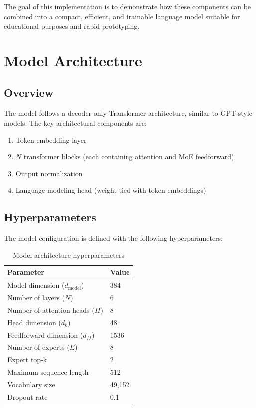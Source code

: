 \documentclass[11pt,a4paper]{article}
\begin{document}
The goal of this implementation is to demonstrate how these components can be combined into a compact, efficient, and trainable language model suitable for educational purposes and rapid prototyping.

\section{Model Architecture}

\subsection{Overview}

The model follows a decoder-only Transformer architecture, similar to GPT-style models. The key architectural components are:

\begin{enumerate}
    \item Token embedding layer
    \item $N$ transformer blocks (each containing attention and MoE feedforward)
    \item Output normalization
    \item Language modeling head (weight-tied with token embeddings)
\end{enumerate}

\subsection{Hyperparameters}

The model configuration is defined with the following hyperparameters:

\begin{table}[h]
\centering
\begin{tabular}{@{}ll@{}}
\toprule
\textbf{Parameter} & \textbf{Value} \\
\midrule
Model dimension ($d_{\text{model}}$) & 384 \\
Number of layers ($N$) & 6 \\
Number of attention heads ($H$) & 8 \\
Head dimension ($d_k$) & 48 \\
Feedforward dimension ($d_{ff}$) & 1536 \\
Number of experts ($E$) & 8 \\
Expert top-k & 2 \\
Maximum sequence length & 512 \\
Vocabulary size & 49,152 \\
Dropout rate & 0.1 \\
\bottomrule
\end{tabular}
\caption{Model architecture hyperparameters}
\label{tab:hyperparameters}
\end{table}
\end{document}
